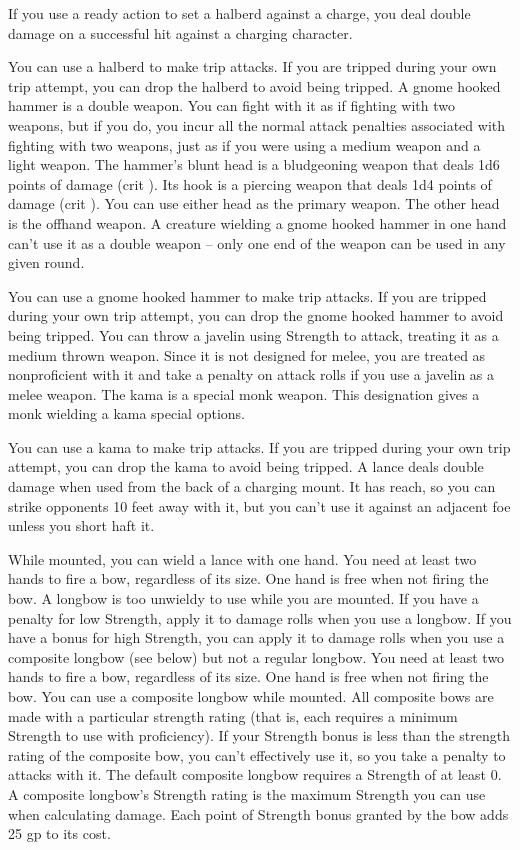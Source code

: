  If you use a ready action to set a halberd against a charge, you deal double damage on a successful hit against a charging character.
\par You can use a halberd to make trip attacks. If you are tripped during your own trip attempt, you can drop the halberd to avoid being tripped.
 A gnome hooked hammer is a double weapon. You can fight with it as if fighting with two weapons, but if you do, you incur all the normal attack penalties associated with fighting with two weapons, just as if you were using a medium weapon and a light weapon. The hammer's blunt head is a bludgeoning weapon that deals 1d6 points of damage (crit ). Its hook is a piercing weapon that deals 1d4 points of damage (crit ). You can use either head as the primary weapon. The other head is the offhand weapon. A creature wielding a gnome hooked hammer in one hand can't use it as a double weapon -- only one end of the weapon can be used in any given round.
\par You can use a gnome hooked hammer to make trip attacks. If you are tripped during your own trip attempt, you can drop the gnome hooked hammer to avoid being tripped.
 You can throw a javelin using Strength to attack, treating it as a medium thrown weapon. Since it is not designed for melee, you are treated as nonproficient with it and take a  penalty on attack rolls if you use a javelin as a melee weapon.
 The kama is a special monk weapon. This designation gives a monk wielding a kama special options.
\par You can use a kama to make trip attacks. If you are tripped during your own trip attempt, you can drop the kama to avoid being tripped.
 A lance deals double damage when used from the back of a charging mount. It has reach, so you can strike opponents 10 feet away with it, but you can't use it against an adjacent foe unless you short haft it.
\par While mounted, you can wield a lance with one hand.
 You need at least two hands to fire a bow, regardless of its size. One hand is free when not firing the bow. A longbow is too unwieldy to use while you are mounted. If you have a penalty for low Strength, apply it to damage rolls when you use a longbow. If you have a bonus for high Strength, you can apply it to damage rolls when you use a composite longbow (see below) but not a regular longbow.
 You need at least two hands to fire a bow, regardless of its size. One hand is free when not firing the bow. You can use a composite longbow while mounted. All composite bows are made with a particular strength rating (that is, each requires a minimum Strength to use with proficiency). If your Strength bonus is less than the strength rating of the composite bow, you can't effectively use it, so you take a  penalty to attacks with it. The default composite longbow requires a Strength of at least 0. A composite longbow's Strength rating is the maximum Strength you can use when calculating damage. Each point of Strength bonus granted by the bow adds 25 gp to its cost.

